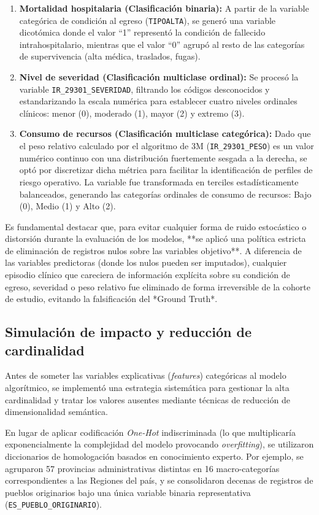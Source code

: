 \begin{enumerate}
    \item \textbf{Mortalidad hospitalaria (Clasificación binaria):} A partir de la variable categórica de condición al egreso (\texttt{TIPOALTA}), se generó una variable dicotómica donde el valor ``1'' representó la condición de fallecido intrahospitalario, mientras que el valor ``0'' agrupó al resto de las categorías de supervivencia (alta médica, traslados, fugas).
    \item \textbf{Nivel de severidad (Clasificación multiclase ordinal):} Se procesó la variable \texttt{IR\_29301\_SEVERIDAD}, filtrando los códigos desconocidos y estandarizando la escala numérica para establecer cuatro niveles ordinales clínicos: menor (0), moderado (1), mayor (2) y extremo (3).
    \item \textbf{Consumo de recursos (Clasificación multiclase categórica):} Dado que el peso relativo calculado por el algoritmo de 3M (\texttt{IR\_29301\_PESO}) es un valor numérico continuo con una distribución fuertemente sesgada a la derecha, se optó por discretizar dicha métrica para facilitar la identificación de perfiles de riesgo operativo. La variable fue transformada en terciles estadísticamente balanceados, generando las categorías ordinales de consumo de recursos: Bajo (0), Medio (1) y Alto (2).
\end{enumerate}

Es fundamental destacar que, para evitar cualquier forma de ruido estocástico o distorsión durante la evaluación de los modelos, **se aplicó una política estricta de eliminación de registros nulos sobre las variables objetivo**. A diferencia de las variables predictoras (donde los nulos pueden ser imputados), cualquier episodio clínico que careciera de información explícita sobre su condición de egreso, severidad o peso relativo fue eliminado de forma irreversible de la cohorte de estudio, evitando la falsificación del *Ground Truth*.

\subsection{Simulación de impacto y reducción de cardinalidad}
Antes de someter las variables explicativas (\textit{features}) categóricas al modelo algorítmico, se implementó una estrategia sistemática para gestionar la alta cardinalidad y tratar los valores ausentes mediante técnicas de reducción de dimensionalidad semántica.

En lugar de aplicar codificación \textit{One-Hot} indiscriminada (lo que multiplicaría exponencialmente la complejidad del modelo provocando \textit{overfitting}), se utilizaron diccionarios de homologación basados en conocimiento experto. Por ejemplo, se agruparon 57 provincias administrativas distintas en 16 macro-categorías correspondientes a las Regiones del país, y se consolidaron decenas de registros de pueblos originarios bajo una única variable binaria representativa (\texttt{ES\_PUEBLO\_ORIGINARIO}).

